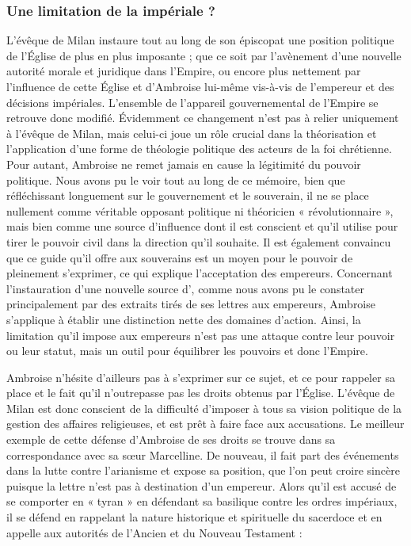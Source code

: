 \bigskip

\subsubsection{Une limitation de la  impériale ?}

L'évêque de Milan instaure tout au long de son épiscopat une position politique de l'Église de plus en plus imposante ; que ce soit par l'avènement d'une nouvelle autorité morale et juridique dans l'Empire, ou encore plus nettement par l'influence de cette Église et d'Ambroise lui-même vis-à-vis de l'empereur et des décisions impériales. L'ensemble de l'appareil gouvernemental de l'Empire se retrouve donc modifié. Évidemment ce changement n'est pas à relier uniquement à l'évêque de Milan, mais celui-ci joue un rôle crucial dans la théorisation et l'application d'une forme de théologie politique des acteurs de la foi chrétienne. Pour autant, Ambroise ne remet jamais en cause la légitimité du pouvoir politique. Nous avons pu le voir tout au long de ce mémoire, bien que réfléchissant longuement sur le gouvernement et le souverain, il ne se place nullement comme véritable opposant politique ni théoricien « révolutionnaire », mais bien comme une source d'influence dont il est conscient et qu'il utilise pour tirer le pouvoir civil dans la direction qu'il souhaite. Il est également convaincu que ce guide qu'il offre aux souverains est un moyen pour le pouvoir de pleinement s'exprimer, ce qui explique l'acceptation des empereurs. Concernant l'instauration d'une nouvelle source d', comme nous avons pu le constater principalement par des extraits tirés de ses lettres aux empereurs, Ambroise s'applique à établir une distinction nette des domaines d'action. Ainsi, la limitation qu'il impose aux empereurs n'est pas une attaque contre leur pouvoir ou leur statut, mais un outil pour équilibrer les pouvoirs et donc l'Empire.

\bigskip

Ambroise n'hésite d'ailleurs pas à s'exprimer sur ce sujet, et ce pour rappeler sa place et le fait qu'il n'outrepasse pas les droits obtenus par l'Église. L'évêque de Milan est donc conscient de la difficulté d'imposer à tous sa vision politique de la gestion des affaires religieuses, et est prêt à faire face aux accusations. Le meilleur exemple de cette défense d'Ambroise de ses droits se trouve dans sa correspondance avec sa sœur Marcelline. De nouveau, il fait part des événements dans la lutte contre l'arianisme et expose sa position, que l'on peut croire sincère puisque la lettre n'est pas à destination d'un empereur. Alors qu'il est accusé de se comporter en « tyran » en défendant sa basilique contre les ordres impériaux, il se défend en rappelant la nature historique et spirituelle du sacerdoce et en appelle aux autorités de l'Ancien et du Nouveau Testament :

